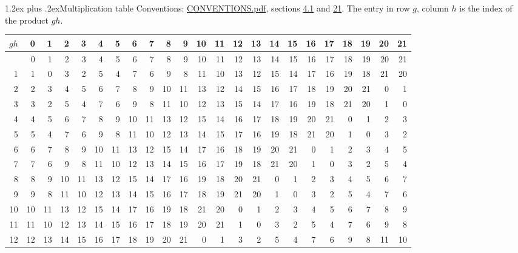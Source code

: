 \documentclass[10pt,a4paper]{article}
\makeatletter
\renewcommand\section{\@startsection{section}{1}{\z@}{-3ex plus -1ex minus -.2ex}%
  {1.2ex plus .2ex}{\normalfont\large\sffamily\bfseries\color{parttitle}}}
\numberwithin{equation}{section}
\makeatother
\begin{document}
\section{Multiplication table}\label{s:multiplication}
Conventions: \href{../../CONVENTIONS.pdf}{CONVENTIONS.pdf}, sections \href{../../../rotation/CONVENTIONS.pdf\#conv.4.1}{4.1} and \href{../../CONVENTIONS.pdf\#conv.21}{21}.
The entry in row $g$, column $h$ is the index of the product $gh$.
{\normalsize\setlength{\tabcolsep}{0.1em}\setlength{\LTleft}{-8pt plus 1fill}\setlength{\LTright}{-8pt plus 1fill}\begin{longtable}{@{}r|rrrrrrrrrrrrrrrrrrrrrr@{}}\toprule
$gh$ & 0 & 1 & 2 & 3 & 4 & 5 & 6 & 7 & 8 & 9 & 10 & 11 & 12 & 13 & 14 & 15 & 16 & 17 & 18 & 19 & 20 & 21\\\midrule\endhead
\bottomrule\endfoot\endlastfoot
0 & 0 & 1 & 2 & 3 & 4 & 5 & 6 & 7 & 8 & 9 & 10 & 11 & 12 & 13 & 14 & 15 & 16 & 17 & 18 & 19 & 20 & 21\\*
1 & 1 & 0 & 3 & 2 & 5 & 4 & 7 & 6 & 9 & 8 & 11 & 10 & 13 & 12 & 15 & 14 & 17 & 16 & 19 & 18 & 21 & 20\\
2 & 2 & 3 & 4 & 5 & 6 & 7 & 8 & 9 & 10 & 11 & 13 & 12 & 14 & 15 & 16 & 17 & 18 & 19 & 20 & 21 & 0 & 1\\
3 & 3 & 2 & 5 & 4 & 7 & 6 & 9 & 8 & 11 & 10 & 12 & 13 & 15 & 14 & 17 & 16 & 19 & 18 & 21 & 20 & 1 & 0\\
4 & 4 & 5 & 6 & 7 & 8 & 9 & 10 & 11 & 13 & 12 & 15 & 14 & 16 & 17 & 18 & 19 & 20 & 21 & 0 & 1 & 2 & 3\\
5 & 5 & 4 & 7 & 6 & 9 & 8 & 11 & 10 & 12 & 13 & 14 & 15 & 17 & 16 & 19 & 18 & 21 & 20 & 1 & 0 & 3 & 2\\
6 & 6 & 7 & 8 & 9 & 10 & 11 & 13 & 12 & 15 & 14 & 17 & 16 & 18 & 19 & 20 & 21 & 0 & 1 & 2 & 3 & 4 & 5\\
7 & 7 & 6 & 9 & 8 & 11 & 10 & 12 & 13 & 14 & 15 & 16 & 17 & 19 & 18 & 21 & 20 & 1 & 0 & 3 & 2 & 5 & 4\\
8 & 8 & 9 & 10 & 11 & 13 & 12 & 15 & 14 & 17 & 16 & 19 & 18 & 20 & 21 & 0 & 1 & 2 & 3 & 4 & 5 & 6 & 7\\
9 & 9 & 8 & 11 & 10 & 12 & 13 & 14 & 15 & 16 & 17 & 18 & 19 & 21 & 20 & 1 & 0 & 3 & 2 & 5 & 4 & 7 & 6\\
10 & 10 & 11 & 13 & 12 & 15 & 14 & 17 & 16 & 19 & 18 & 21 & 20 & 0 & 1 & 2 & 3 & 4 & 5 & 6 & 7 & 8 & 9\\
11 & 11 & 10 & 12 & 13 & 14 & 15 & 16 & 17 & 18 & 19 & 20 & 21 & 1 & 0 & 3 & 2 & 5 & 4 & 7 & 6 & 9 & 8\\
12 & 12 & 13 & 14 & 15 & 16 & 17 & 18 & 19 & 20 & 21 & 0 & 1 & 3 & 2 & 5 & 4 & 7 & 6 & 9 & 8 & 11 & 10\\

\end{longtable}}
\end{document}
